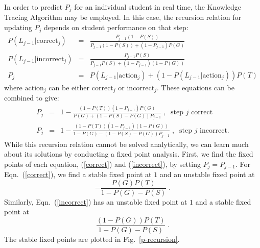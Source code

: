 \documentclass{acmlarge-edm}
\begin{document}
In order to predict $P_j$ for an individual student in real time,
the Knowledge Tracing Algorithm may be employed.  In this case, 
the recursion relation for updating $P_j$ 
\cite{corbett_knowledge_1994,baker_more_2008} depends on
student performance on that step:
\begin{eqnarray}
       P\left(L_{j-1}|\mbox{correct}_j\right) &=&
       \frac{P_{j-1}\left(1-P(S)\right)}{P_{j-1}\left(1-P(S)\right)+
                                       \left(1-P_{j-1}\right)P(G)} \\
        P\left(L_{j-1}|\mbox{incorrect}_j\right) &=& 
              \frac{P_{j-1} P(S)}
              {P_{j-1} P(S)+ \left(1-P_{j-1}\right)\left(1-P(G)\right)}
                        \\
       P_j &=& P\left(L_{j-1}|\mbox{action}_j\right)+
               \left(1-P\left(L_{j-1}|\mbox{action}_j\right)\right) P(T)
\end{eqnarray}
%
where $\mbox{action}_j$ can be either $\mbox{correct}_j$ or 
$\mbox{incorrect}_j$.  These equations can be combined to give:
%
\begin{eqnarray}
       P_j &=&
       1-\frac{\left(1-P(T)\right)\left(1-P_{j-1}\right)P(G)}{P(G)+\left(1-P(S)-P(G)\right)
        P_{j-1}}  \;,\;\; \mbox{step $j$ correct} \label{correct}\\
      P_j &=& 1-\frac{\left(1-P(T)\right)\left(1-P_{j-1}\right)\left(1-P(G)\right)}
                                 {1-P(G)-\left(1-P(S)-P(G)\right) P_{j-1}}
                        \; ,\;\; \mbox{step $j$ incorrect.} \label{incorrect}
\end{eqnarray}
%
While this recursion relation cannot be solved analytically, we
can learn much about its solutions by conducting a fixed point analysis.
First, we find the fixed points of each equation, (\ref{correct}) and
(\ref{incorrect}), by setting $P_j=P_{j-1}$.  For Eqn.~(\ref{correct}), we
find a stable fixed point at $1$ and an unstable fixed point at
\begin{equation}
    - \frac{P(G) P(T)}{1-P(G)-P(S)} \; .
      \label{correctfixedpoint}
\end{equation}
Similarly, Eqn.~(\ref{incorrect}) has an unstable fixed point at $1$
and a stable fixed point at
\begin{equation}
    \frac{\left(1-P(G)\right) P(T)}{1-P(G)-P(S)} \; . 
       \label{incorrectfixedpoint}
\end{equation}
The stable fixed points are plotted in Fig.~\ref{p-recursion}.
\end{document}
